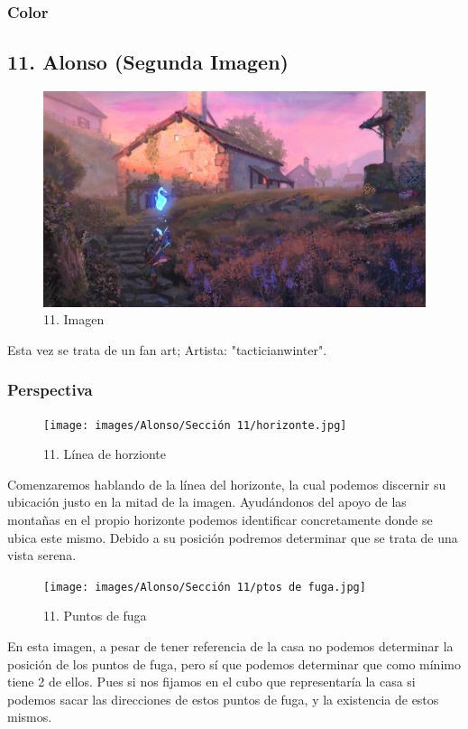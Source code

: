 \documentclass[12pt]{article}
\begin{document}
        \subsubsection{Color}
        \newpage


    \subsection{11. Alonso (Segunda Imagen)}
    \begin{figure}[H]
      \centering
      \includegraphics[scale=0.35]{images/Concepts/11_concept_art.jpg}
      \caption{\small 11. Imagen}
    \end{figure}
    Esta vez se trata de un fan art; Artista: "tacticianwinter".

        \subsubsection{Perspectiva}
        \begin{figure}[H]
      \centering
      \texttt{[image: images/Alonso/Sección 11/horizonte.jpg]}
      \caption{\small 11. Línea de horzionte}
    \end{figure}
    Comenzaremos hablando de la línea del horizonte, la cual podemos discernir su ubicación justo en la mitad de la imagen. Ayudándonos del apoyo de las montañas en el propio horizonte podemos identificar concretamente donde se ubica este mismo. Debido a su posición podremos determinar que se trata de una vista serena.

    \begin{figure}[H]
      \centering
      \texttt{[image: images/Alonso/Sección 11/ptos de fuga.jpg]}
      \caption{\small 11. Puntos de fuga}
    \end{figure}
    En esta imagen, a pesar de tener referencia de la casa no podemos determinar la posición de los puntos de fuga, pero sí que podemos determinar que como mínimo tiene 2 de ellos. Pues si nos fijamos en el cubo que representaría la casa si podemos sacar las direcciones de estos puntos de fuga, y la existencia de estos mismos.
\end{document}
